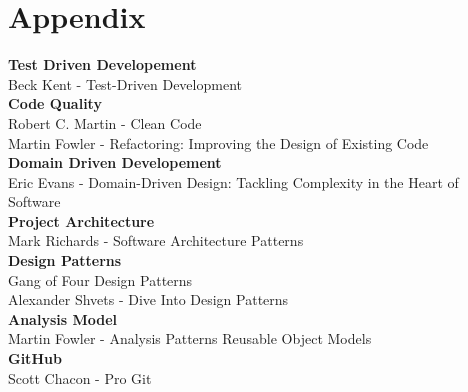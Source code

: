 \documentclass{article}
\begin{document}
\part{Appendix}
\textbf{Test Driven Developement}\\
Beck Kent - Test-Driven Development\\
\textbf{Code Quality}\\
Robert C. Martin - Clean Code\\
Martin Fowler - Refactoring: Improving the Design of Existing Code\\
\textbf{Domain Driven Developement}\\
Eric Evans - Domain-Driven Design: Tackling Complexity in the Heart of Software\\
\textbf{Project Architecture}\\
Mark Richards - Software Architecture Patterns\\
\textbf{Design Patterns}\\
Gang of Four Design Patterns\\
Alexander Shvets - Dive Into Design Patterns\\
\textbf{Analysis Model}\\
Martin Fowler - Analysis Patterns Reusable Object Models\\
\textbf{GitHub}\\
Scott Chacon - Pro Git\\
\end{document}
